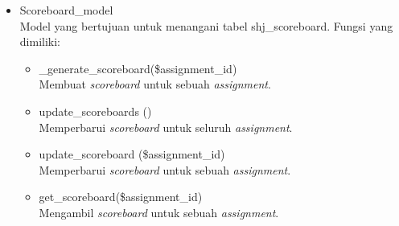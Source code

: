 \begin{itemize}
            \item Scoreboard\_model\\
 Model yang bertujuan untuk menangani tabel shj\_scoreboard. Fungsi yang dimiliki:
        \begin{itemize}
            \item \_generate\_scoreboard(\$assignment\_id)\\
 Membuat \textit{scoreboard} untuk sebuah \textit{assignment}.
            \item update\_scoreboards ()\\
 Memperbarui \textit{scoreboard} untuk seluruh \textit{assignment}.
            \item update\_scoreboard (\$assignment\_id)\\
 Memperbarui \textit{scoreboard} untuk sebuah \textit{assignment}. 
            \item get\_scoreboard(\$assignment\_id)\\
 Mengambil \textit{scoreboard} untuk sebuah \textit{assignment}.
        
        \end{itemize}
            


\end{itemize}
